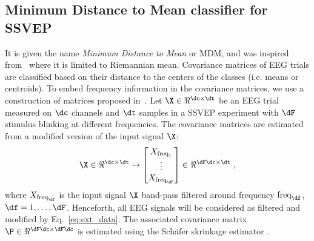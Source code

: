 \subsection{Minimum Distance to Mean classifier for SSVEP}
\label{subsec:mdm}
\iflatexml\else {} \fi
It is given the name \emph{Minimum Distance to Mean} or MDM, and was inspired from~\cite{barachant_multiclass_2012} where it is limited to Riemannian mean.
Covariance matrices of EEG trials are classified based on their distance to the centers of the classes (i.e. means or centroids).
To embed frequency information in the covariance matrices, we use a construction of matrices proposed in~\cite{congedo_new_2013}.
Let $\X \in \Re^{\dc\times\dt}$ be an EEG trial measured on $\dc$ channels and $\dt$ samples in a SSVEP experiment with $\dF$ stimulus blinking at different frequencies.  
The covariance matrices are estimated from a modified version of the input signal $\X$: %
\begin{equation}
	\X \in \Re^{\dc \times \dt} \rightarrow 	
	\begin{bmatrix}
		X_{\text{freq}_1}\\ \vdots \\ X_{\text{freq}_{\dF}} \\
	\end{bmatrix}
	\in \Re^{\dF\dc \times \dt} \ ,
	\label{eq:ext_data}
\end{equation}
where $X_{\text{freq}_\df}$ is the input signal $\X$ band-pass filtered around frequency $\text{freq}_\df$, $\df=1, \ldots, \dF$. Henceforth, all EEG signals will be considered as filtered and modified by Eq.~\eqref{eq:ext_data}.
The associated covariance matrix $\P \in \Re^{\dF\dc \times \dF\dc}$ is estimated using the Sch\"{a}fer skrinkage estimator \cite{schafer_shrinkage_2005}.

